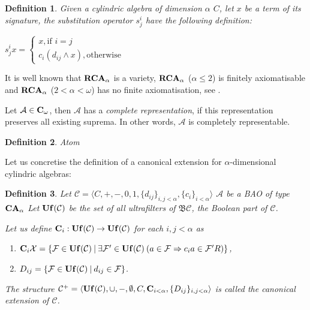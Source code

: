 \documentclass[a4paper]{article}
\theoremstyle{defin}
\newtheorem{defin}{Definition}
\theoremstyle{theorem}
\theoremstyle{prop}
\theoremstyle{lemma}
\theoremstyle{fact}
\theoremstyle{ex}
\theoremstyle{col}
\begin{document}
\begin{defin}
  Given a cylindric algebra of dimension $\alpha$ $C$, let $x$ be a term of its signature, the substitution operator $s^{i}_{j}$ have the following definition:
  \begin{center}
  $s^{i}_{j} x = \begin{cases} x, \text{if } i = j \\ c_i (d_{ij} \land x), \text{otherwise} \end{cases}$
  \end{center}
\end{defin}

It is well known that ${\bf RCA}_{\alpha}$ is a variety, ${\bf RCA}_{\alpha}$ ($\alpha \leq 2$) is finitely axiomatisable and ${\bf RCA}_{\alpha}$ ($2 < \alpha < \omega$) has no finite axiomatisation, see \cite{Henkin1988-HENCAP-4}.

Let $\mathcal{A} \in {\bf C}_{\omega}$, then $\mathcal{A}$ has a \emph{complete representation}, if this representation preserves all existing suprema. In other words, $\mathcal{A}$ is completely representable.

\begin{defin} Atom
\end{defin}

Let us concretise the definition of a canonical extension for $\alpha$-dimensional cylindric algebras:

\begin{defin}
  Let $\mathcal{C} = \langle C, +, -, 0, 1, \{ d_{ij} \}_{i, j < \alpha}, \{c_i\}_{i < \alpha} \rangle$ $\mathcal{A}$ be a BAO of type ${\bf CA}_{\alpha}$ Let ${\bf Uf}(\mathcal{C})$ be the set of all ultrafilters of $\mathfrak{B}\mathcal{C}$, the Boolean part of $\mathcal{C}$.

  Let us define ${\bf C}_{i} : {\bf Uf}(\mathcal{C}) \to {\bf Uf}(\mathcal{C})$ for each $i, j < \alpha$ as
  \begin{enumerate}
\item ${\bf C}_{i} \mathcal{X} = \{ \mathcal{F} \in {\bf Uf}(\mathcal{C}) \: | \: \exists \mathcal{F}' \in {\bf Uf}(\mathcal{C}) \: (a \in \mathcal{F} \Rightarrow c_i a \in \mathcal{F}' R)\}$,
\item $D_{ij} = \{ \mathcal{F} \in {\bf Uf}(\mathcal{C}) \: | \: d_{ij} \in \mathcal{F} \}$.
  \end{enumerate}
  The structure $\mathcal{C}^{+} = \langle  {\bf Uf}(\mathcal{C}), \cup, -, \emptyset, C, {\bf C}_{i < \alpha}, \{D_{ij}\}_{i, j < \alpha} \rangle$ is called the canonical extension of $\mathcal{C}$.
\end{defin}
\end{document}
